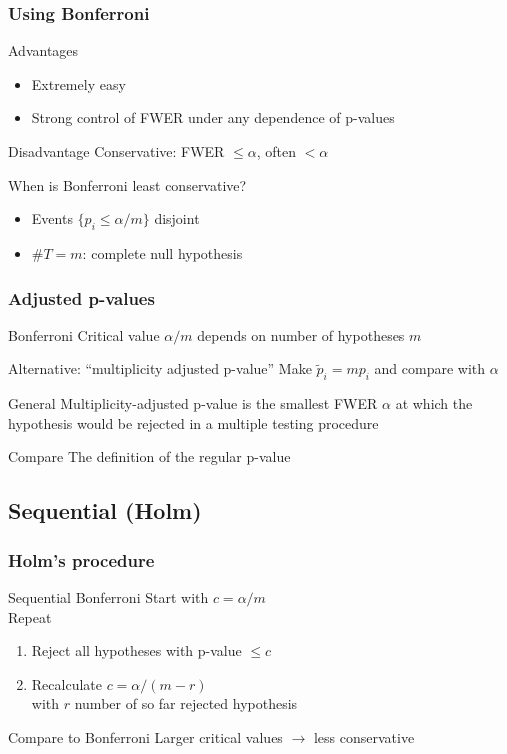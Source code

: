 \documentclass[compress]{beamer}
\newcommand{\bb}[1]{\begin{block}{#1}}
\newcommand{\eb}{\end{block}}
\newcommand{\bi}{\begin {itemize}}
\newcommand{\ei}{\end{itemize}}
\newcommand{\be}{\begin {enumerate}}
\newcommand{\ee}{\end{enumerate}}
\newcommand{\bfr}[1]{\begin{frame} \frametitle{#1}}
\begin{document}
\bfr{Using Bonferroni}
  \bb{Advantages}
    \bi
      \item Extremely easy
      \item Strong control of FWER under any dependence of p-values
    \ei
  \eb
  \bb{Disadvantage}
    Conservative: FWER $\leq \alpha$, often $<\alpha$
  \eb
  \bb{When is Bonferroni least conservative?}
    \bi
      \item Events $\{p_i \leq \alpha/m\}$ disjoint
      \item $\# T = m$: complete null hypothesis
    \ei
  \eb
\end{frame}


\bfr{Adjusted p-values}
  \bb{Bonferroni}
    Critical value $\alpha/m$ depends on number of hypotheses $m$
  \eb
  \bb{Alternative: ``multiplicity adjusted p-value''}
    Make $\tilde p_i = mp_i$ and compare with $\alpha$
  \eb
  \bb{General}
    Multiplicity-adjusted p-value is the smallest FWER $\alpha$ at which the hypothesis would be rejected in a multiple testing procedure
  \eb
  \bb{Compare}
    The definition of the regular p-value
  \eb
\end{frame}


\subsection{Sequential (Holm)}

\bfr{Holm's procedure}
  \bb{Sequential Bonferroni}
    Start with $c = \alpha/m$
    \\ Repeat
    \be
      \item Reject all hypotheses with p-value $\leq c$
      \item Recalculate $c = \alpha/(m-r)$ \\ with $r$ number of so far rejected hypothesis
    \ee
  \eb
  \bb{Compare to Bonferroni}
    Larger critical values $\to$ less conservative
  \eb
\end{frame}
\end{document}
